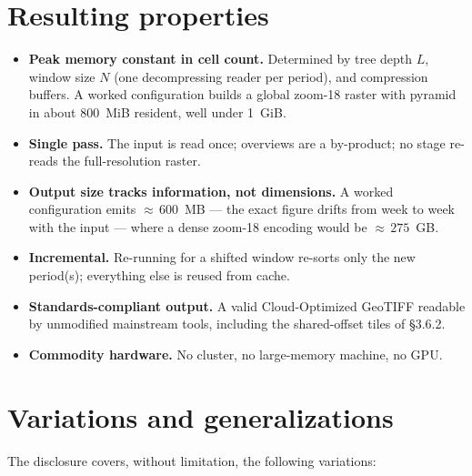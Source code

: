 \documentclass[10pt,twocolumn]{article}
\begin{document}
\section{Resulting properties}

\begin{itemize}
\item \textbf{Peak memory constant in cell count.} Determined by tree depth
  $L$, window size $N$ (one decompressing reader per period), and compression
  buffers. A worked configuration builds a global zoom-18 raster with pyramid
  in about 800~MiB resident, well under 1~GiB.
\item \textbf{Single pass.} The input is read once; overviews are a by-product;
  no stage re-reads the full-resolution raster.
\item \textbf{Output size tracks information, not dimensions.} A worked
  configuration emits ${\approx}\,600$~MB --- the exact figure drifts from week
  to week with the input --- where a dense zoom-18 encoding would be
  ${\approx}\,275$~GB.
\item \textbf{Incremental.} Re-running for a shifted window re-sorts only the
  new period(s); everything else is reused from cache.
\item \textbf{Standards-compliant output.} A valid Cloud-Optimized GeoTIFF
  readable by unmodified mainstream tools, including the shared-offset tiles of
  \S3.6.2.
\item \textbf{Commodity hardware.} No cluster, no large-memory machine, no GPU.
\end{itemize}

\section{Variations and generalizations}

The disclosure covers, without limitation, the following variations:
\end{document}

